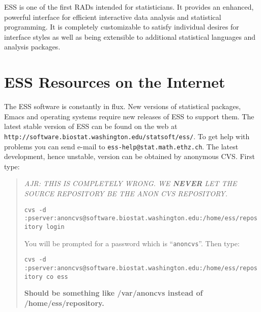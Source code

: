 \documentclass{article}
\newif\ifdraft
\def\url#1{\stexttt{#1}} %
\newcommand{\stexttt}[1]{{\small\texttt{#1}}}
\newenvironment{Comment}{\begin{quote}\small\itshape }{\end{quote}}
\begin{document}
ESS is one of the first RADs intended for statisticians.  It provides
an enhanced, powerful interface for efficient interactive data
analysis and statistical programming.  It is completely customizable
to satisfy individual desires for interface styles as well as being
extensible to additional statistical languages and analysis packages.

\section*{ESS Resources on the Internet}
\label{sec:access}
The ESS software is constantly in flux.  New versions of statistical
packages, Emacs and operating systems require new releases of ESS to
support them.  The latest stable version of ESS can be found on the web at
\url{http://software.biostat.washington.edu/statsoft/ess/}.  To get help
with problems you can send e-mail to \url{ess-help@stat.math.ethz.ch}.
The latest development, hence unstable, version can be obtained by
anonymous CVS.  First type:

\begin{Comment}
  AJR:  THIS IS COMPLETELY WRONG.   WE \textbf{NEVER} LET THE SOURCE REPOSITORY BE THE ANON CVS REPOSITORY.

  \stexttt{cvs -d :pserver:anoncvs@software.biostat.washington.edu:/home/ess/repository login}

  You will be prompted for a password which is ``\stexttt{anoncvs}''.  Then type: 

  \stexttt{cvs -d :pserver:anoncvs@software.biostat.washington.edu:/home/ess/repository co ess}
  
  \textbf{Should be something like /var/anoncvs instead of
    /home/ess/repository.}
  
\end{Comment}






\ifdraft
\newpage
\tableofcontents
\fi
\end{document}
